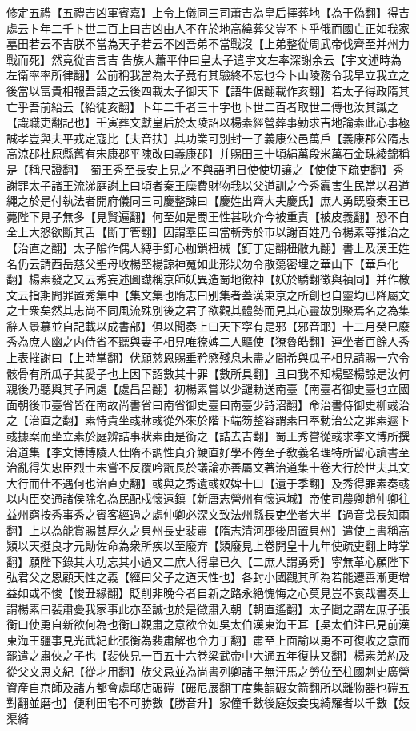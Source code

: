 修定五禮【五禮吉凶軍賓嘉】上令上儀同三司蕭吉為皇后擇葬地【為于偽翻】得吉處云卜年二千卜世二百上曰吉凶由人不在於地高緯葬父豈不卜乎俄而國亡正如我家墓田若云不吉朕不當為天子若云不凶吾弟不當戰沒【上弟整從周武帝伐齊至并州力戰而死】然竟從吉言吉告族人蕭平仲曰皇太子遣宇文左率深謝余云【宇文述時為左衛率率所律翻】公前稱我當為太子竟有其驗終不忘也今卜山陵務令我早立我立之後當以富貴相報吾語之云後四載太子御天下【語牛倨翻載作亥翻】若太子得政隋其亡乎吾前紿云【紿徒亥翻】卜年二千者三十字也卜世二百者取世二傳也汝其識之【識職吏翻記也】壬寅葬文獻皇后於太陵詔以楊素經營葬事勤求吉地論素此心事極誠孝豈與夫平戎定寇比【夫音扶】其功業可别封一子義康公邑萬戶【義康郡公隋志高涼郡杜原縣舊有宋康郡平陳改曰義康郡】并賜田三十頃絹萬段米萬石金珠綾錦稱是【稱尺證翻】　蜀王秀至長安上見之不與語明日使使切讓之【使使下疏吏翻】秀謝罪太子諸王流涕庭謝上曰頃者秦王糜費財物我以父道訓之今秀蠧害生民當以君道繩之於是付執法者開府儀同三司慶整諫曰【慶姓出齊大夫慶氏】庶人勇既廢秦王已薨陛下見子無多【見賢遍翻】何至如是蜀王性甚耿介今被重責【被皮義翻】恐不自全上大怒欲斷其舌【斷丁管翻】因謂羣臣曰當斬秀於市以謝百姓乃令楊素等推治之【治直之翻】太子隂作偶人縛手釘心枷鎖杻械【釘丁定翻杻敝九翻】書上及漢王姓名仍云請西岳慈父聖母收楊堅楊諒神䰟如此形狀勿令散蕩密埋之華山下【華戶化翻】楊素發之又云秀妄述圖䜟稱京師妖異造蜀地徵神【妖於驕翻徵與禎同】并作檄文云指期問罪置秀集中【集文集也隋志曰别集者蓋漢東京之所創也自靈均已降屬文之士衆矣然其志尚不同風流殊别後之君子欲觀其體勢而見其心靈故别聚焉名之為集辭人景慕並自記載以成書部】俱以聞奏上曰天下寜有是邪【邪音耶】十二月癸巳廢秀為庶人幽之内侍省不聽與妻子相見唯獠婢二人驅使【獠魯皓翻】連坐者百餘人秀上表摧謝曰【上時掌翻】伏願慈恩賜垂矜愍殘息未盡之間希與瓜子相見請賜一穴令骸骨有所瓜子其愛子也上因下詔數其十罪【數所具翻】且曰我不知楊堅楊諒是汝何親後乃聽與其子同處【處昌呂翻】初楊素嘗以少譴勅送南臺【南臺者御史臺也立國面朝後市臺省皆在南故尚書省曰南省御史臺曰南臺少詩沼翻】命治書侍御史柳彧治之【治直之翻】素恃貴坐彧牀彧從外來於階下端笏整容謂素曰奉勅治公之罪素遽下彧據案而坐立素於庭辨詰事狀素由是銜之【詰去吉翻】蜀王秀嘗從彧求李文博所撰治道集【李文博博陵人仕隋不調性貞介鯁直好學不倦至子敎義名理特所留心讀書至治亂得失忠臣烈士未嘗不反覆吟翫長於議論亦善屬文著治道集十卷大行於世夫其文大行而仕不遇何也治直吏翻】彧與之秀遺彧奴婢十口【遺于季翻】及秀得罪素奏彧以内臣交通諸侯除名為民配戍懷遠鎮【新唐志營州有懷遠城】帝使司農卿趙仲卿往益州窮按秀事秀之賓客經過之處仲卿必深文致法州縣長吏坐者大半【過音戈長知兩翻】上以為能賞賜甚厚久之貝州長史裴肅【隋志清河郡後周置貝州】遣使上書稱高熲以天挺良才元勛佐命為衆所疾以至廢弃【熲廢見上卷開皇十九年使疏吏翻上時掌翻】願陛下錄其大功忘其小過又二庶人得辠已久【二庶人謂勇秀】寜無革心願陛下弘君父之恩顧天性之義【經曰父子之道天性也】各封小國觀其所為若能遷善漸更增益如或不悛【悛丑緣翻】貶削非晩今者自新之路永絶愧悔之心莫見豈不哀哉書奏上謂楊素曰裴肅憂我家事此亦至誠也於是徵肅入朝【朝直遙翻】太子聞之謂左庶子張衡曰使勇自新欲何為也衡曰觀肅之意欲令如吳太伯漢東海王耳【吳太伯注已見前漢東海王疆事見光武紀此張衡為裴肅解也令力丁翻】肅至上面諭以勇不可復收之意而罷遣之肅俠之子也【裴俠見一百五十六卷梁武帝中大通五年復扶又翻】楊素弟約及從父文思文紀【從才用翻】族父忌並為尚書列卿諸子無汗馬之勞位至柱國刺史廣營資產自京師及諸方都會處邸店碾磑【碾尼展翻丁度集韻碾女箭翻所以離物器也磑五對翻並磨也】便利田宅不可勝數【勝音升】家僮千數後庭妓妾曳綺羅者以千數【妓渠綺